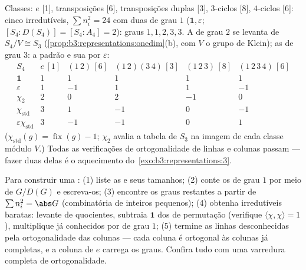 \begin{example}[A tabela de $S_4$]\label{ex:b3:representations:s4}
Classes: $e$ [1], transposições [6], transposições duplas [3],
$3$-ciclos [8], $4$-ciclos [6]: cinco irredutíveis, $\sum n_i^2 =
24$ com
duas de grau $1$ ($\mathbf 1, \varepsilon$; $[S_4 :
D(S_4)] = [S_4 : A_4] = 2$): graus $1, 1, 2, 3, 3$. A de grau $2$ se
levanta de $S_4/V \cong S_3$ (\cref{prop:b3:representations:onedim}(b), com $V$ o grupo de Klein); as
de grau $3$: a  padrão e sua  por $\varepsilon$:
\[
\begin{array}{c|ccccc}
S_4 & e\,[1] & (1\,2)\,[6] & (1\,2)(3\,4)\,[3] &
(1\,2\,3)\,[8] & (1\,2\,3\,4)\,[6]\\
\hline
\mathbf 1 & 1 & 1 & 1 & 1 & 1\\
\varepsilon & 1 & -1 & 1 & 1 & -1\\
\chi_2 & 2 & 0 & 2 & -1 & 0\\
\chi_{\mathrm{std}} & 3 & 1 & -1 & 0 & -1\\
\varepsilon\chi_{\mathrm{std}} & 3 & -1 & -1 & 0 & 1
\end{array}
\]
($\chi_{\mathrm{std}}(g) = \operatorname{fix}(g) - 1$; $\chi_2$ avalia a tabela de $S_3$ na imagem de cada
classe módulo $V$.) Todas as verificações de ortogonalidade de
linhas e colunas passam --- fazer duas delas é o aquecimento do~\cref{exo:b3:representations:3}.
\end{example}

\begin{method}\label{met:b3:representations:table}
Para construir uma : (1) liste as  e seus tamanhos; (2) conte os  de grau $1$ por
meio de $G/D(G)$ e escreva-os; (3) encontre os graus restantes a
partir de $\sum n_i^2 = \abs G$ (combinatória de inteiros pequenos); (4) obtenha
irredutíveis baratas: levante de quocientes, subtraia $\mathbf 1$ dos
 de permutação (verifique $\langle\chi,\chi\rangle = 1$), multiplique  já
conhecidos por  de grau $1$; (5) termine as linhas
desconhecidas pela ortogonalidade das colunas --- cada coluna é
ortogonal às colunas já completas, e a coluna de $e$ carrega os
graus. Confira tudo com uma varredura completa de ortogonalidade.
\end{method}

